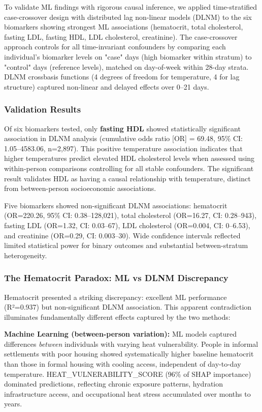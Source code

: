 To validate ML findings with rigorous causal inference, we applied time-stratified case-crossover design with distributed lag non-linear models (DLNM) to the six biomarkers showing strongest ML associations (hematocrit, total cholesterol, fasting LDL, fasting HDL, LDL cholesterol, creatinine). The case-crossover approach controls for all time-invariant confounders by comparing each individual's biomarker levels on "case" days (high biomarker within stratum) to "control" days (reference levels), matched on day-of-week within 28-day strata. DLNM crossbasis functions (4 degrees of freedom for temperature, 4 for lag structure) captured non-linear and delayed effects over 0--21 days.

\subsubsection{Validation Results}

Of six biomarkers tested, only \textbf{fasting HDL} showed statistically significant association in DLNM analysis (cumulative odds ratio [OR] = 69.48, 95\% CI: 1.05--4583.06, n=2,897). This positive temperature association indicates that higher temperatures predict elevated HDL cholesterol levels when assessed using within-person comparisons controlling for all stable confounders. The significant result validates HDL as having a causal relationship with temperature, distinct from between-person socioeconomic associations.

Five biomarkers showed non-significant DLNM associations: hematocrit (OR=220.26, 95\% CI: 0.38--128,021), total cholesterol (OR=16.27, CI: 0.28--943), fasting LDL (OR=1.32, CI: 0.03--67), LDL cholesterol (OR=0.004, CI: 0--6.53), and creatinine (OR=0.29, CI: 0.003--30). Wide confidence intervals reflected limited statistical power for binary outcomes and substantial between-stratum heterogeneity.

\subsubsection{The Hematocrit Paradox: ML vs DLNM Discrepancy}

Hematocrit presented a striking discrepancy: excellent ML performance (R²=0.937) but non-significant DLNM association. This apparent contradiction illuminates fundamentally different effects captured by the two methods:

\textbf{Machine Learning (between-person variation):} ML models captured differences \textit{between} individuals with varying heat vulnerability. People in informal settlements with poor housing showed systematically higher baseline hematocrit than those in formal housing with cooling access, independent of day-to-day temperature. HEAT\_VULNERABILITY\_SCORE (96\% of SHAP importance) dominated predictions, reflecting chronic exposure patterns, hydration infrastructure access, and occupational heat stress accumulated over months to years.


